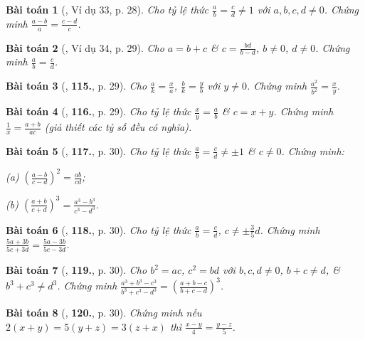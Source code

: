 \documentclass{article}
\numberwithin{equation}{section}
\newtheorem{baitoan}{Bài toán}
\begin{document}
\begin{baitoan}[\cite{Tuyen_Toan_7}, Ví dụ 33, p. 28]
	Cho tỷ lệ thức $\frac{a}{b} = \frac{c}{d}\ne 1$ với $a,b,c,d\ne 0$. Chứng minh $\frac{a - b}{a} = \frac{c - d}{c}$.
\end{baitoan}

\begin{baitoan}[\cite{Tuyen_Toan_7}, Ví dụ 34, p. 29]
	Cho $a = b + c$ \& $c = \frac{bd}{b - d}$, $b\ne 0$, $d\ne 0$. Chứng minh $\frac{a}{b} = \frac{c}{d}$.
\end{baitoan}

\begin{baitoan}[\cite{Tuyen_Toan_7}, \textbf{115.}, p. 29]
	Cho $\frac{a}{k} = \frac{x}{a}$, $\frac{b}{k} = \frac{y}{b}$ với $y\ne 0$. Chứng minh $\frac{a^2}{b^2} = \frac{x}{y}$.
\end{baitoan}

\begin{baitoan}[\cite{Tuyen_Toan_7}, \textbf{116.}, p. 29]
	Cho tỷ lệ thức $\frac{x}{y} = \frac{a}{b}$ \& $c = x + y$. Chứng minh $\frac{1}{x} = \frac{a + b}{ac}$ (giả thiết các tỷ số đều có nghĩa).
\end{baitoan}

\begin{baitoan}[\cite{Tuyen_Toan_7}, \textbf{117.}, p. 30]
	Cho tỷ lệ thức $\frac{a}{b} = \frac{c}{d}\ne\pm 1$ \& $c\ne 0$. Chứng minh:
	\begin{enumerate*}
		\item[(a)] $\left(\frac{a - b}{c - d}\right)^2 = \frac{ab}{cd}$;
		\item[(b)] $\left(\frac{a + b}{c + d}\right)^3 = \frac{a^3 - b^3}{c^3 - d^3}$.
	\end{enumerate*}
\end{baitoan}

\begin{baitoan}[\cite{Tuyen_Toan_7}, \textbf{118.}, p. 30]
	Cho tỷ lệ thức $\frac{a}{b} = \frac{c}{d}$, $c\ne\pm\frac{3}{5}d$. Chứng minh $\frac{5a + 3b}{5c + 3d} = \frac{5a - 3b}{5c - 3d}$.
\end{baitoan}

\begin{baitoan}[\cite{Tuyen_Toan_7}, \textbf{119.}, p. 30]
	Cho $b^2 = ac$, $c^2 = bd$ với $b,c,d\ne 0$, $b + c\ne d$, \& $b^3 + c^3\ne d^3$. Chứng minh $\frac{a^3 + b^3 - c^3}{b^3 + c^3 - d^3} = \left(\frac{a + b - c}{b + c - d}\right)^3$.
\end{baitoan}

\begin{baitoan}[\cite{Tuyen_Toan_7}, \textbf{120.}, p. 30]
	Chứng minh nếu $2(x + y) = 5(y + z) = 3(z + x)$ thì $\frac{x - y}{4} = \frac{y - z}{5}$.
\end{baitoan}
\end{document}
